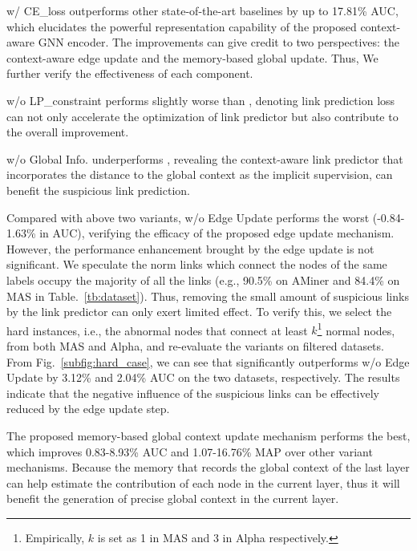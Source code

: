 \smodel w/ CE\_loss outperforms other state-of-the-art baselines by up to 17.81\% AUC, which elucidates the powerful representation capability of the proposed context-aware GNN encoder. The improvements can give credit to two perspectives: the context-aware edge update and the memory-based global update. Thus, We further verify the effectiveness of each component.   

 \smodel w/o LP\_constraint performs slightly worse than \model, denoting link prediction loss can not only accelerate the optimization of link predictor but also contribute to the overall improvement. 

\smodel w/o Global Info. underperforms \model, revealing the context-aware link predictor that incorporates the distance to the global context as the implicit supervision, can benefit the suspicious link prediction.

Compared with above two variants, \smodel w/o Edge Update performs the worst (-0.84-1.63\% in AUC), verifying the efficacy of the proposed edge update mechanism. However, the performance enhancement brought by the edge update is not significant. We speculate the norm links which connect the nodes of the same labels occupy the majority of all the links (e.g., 90.5\% on AMiner and 84.4\% on MAS in Table.~\ref{tb:dataset}). Thus, removing the small amount of suspicious links by the link predictor can only exert limited effect. To verify this, we select the hard instances, i.e., the abnormal nodes that connect at least $k$\footnote{Empirically, $k$ is set as 1 in MAS and 3 in Alpha respectively.} normal nodes, from both MAS and Alpha, and re-evaluate the variants on filtered datasets. From Fig.~\ref{subfig:hard_case}, we can see that \smodel significantly outperforms w/o Edge Update by 3.12\% and 2.04\% AUC on the two datasets, respectively. The results indicate that the negative influence of the suspicious links can be effectively reduced by the edge update step.   

 The proposed memory-based global context update mechanism performs the best, which improves 0.83-8.93\% AUC and 1.07-16.76\% MAP over other variant mechanisms. Because the memory that records the global context of the last layer can help estimate the contribution of each node in the current layer, thus it will benefit the generation of precise global context in the current layer.


